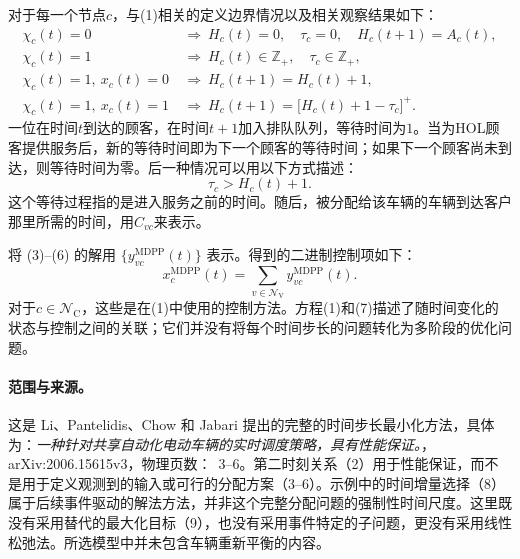 \documentclass{article}
\begin{document}
对于每一个节点$c$，与(1)相关的定义边界情况以及相关观察结果如下：
\begin{align*}
\chi_c(t)=0
&\ \Longrightarrow\ H_c(t)=0,\quad \tau_c=0,\quad H_c(t+1)=A_c(t),\\
\chi_c(t)=1
&\ \Longrightarrow\ H_c(t)\in\mathbb Z_+,\quad \tau_c\in\mathbb Z_+,\\
\chi_c(t)=1,\ x_c(t)=0
&\ \Longrightarrow\ H_c(t+1)=H_c(t)+1,\\
\chi_c(t)=1,\ x_c(t)=1
&\ \Longrightarrow\ H_c(t+1)=\bigl[H_c(t)+1-\tau_c\bigr]^+.
\end{align*}
一位在时间$t$到达的顾客，在时间$t+1$加入排队队列，等待时间为$1$。当为HOL顾客提供服务后，新的等待时间即为下一个顾客的等待时间；如果下一个顾客尚未到达，则等待时间为零。后一种情况可以用以下方式描述：
\[
\tau_c>H_c(t)+1.
\]
这个等待过程指的是进入服务之前的时间。随后，被分配给该车辆的车辆到达客户那里所需的时间，用$C_{vc}$来表示。

将 (3)--(6) 的解用 $\{y^{\mathrm{MDPP}}_{vc}(t)\}$ 表示。得到的二进制控制项如下：
\begin{equation}
x^{\mathrm{MDPP}}_c(t)=\sum_{v\in\mathcal N_{\mathrm V}}y^{\mathrm{MDPP}}_{vc}(t). \tag{7}
\end{equation}
对于$c\in\mathcal N_{\mathrm C}$，这些是在(1)中使用的控制方法。方程(1)和(7)描述了随时间变化的状态与控制之间的关联；它们并没有将每个时间步长的问题转化为多阶段的优化问题。

\paragraph{范围与来源。}
这是 Li、Pantelidis、Chow 和 Jabari 提出的完整的时间步长最小化方法，具体为：\emph{一种针对共享自动化电动车辆的实时调度策略，具有性能保证。}，arXiv:2006.15615v3，物理页数：~3--6。第二时刻关系（2）用于性能保证，而不是用于定义观测到的输入或可行的分配方案（3--6）。示例中的时间增量选择（8）属于后续事件驱动的解法方法，并非这个完整分配问题的强制性时间尺度。这里既没有采用替代的最大化目标（9），也没有采用事件特定的子问题，更没有采用线性松弛法。所选模型中并未包含车辆重新平衡的内容。
\end{document}
